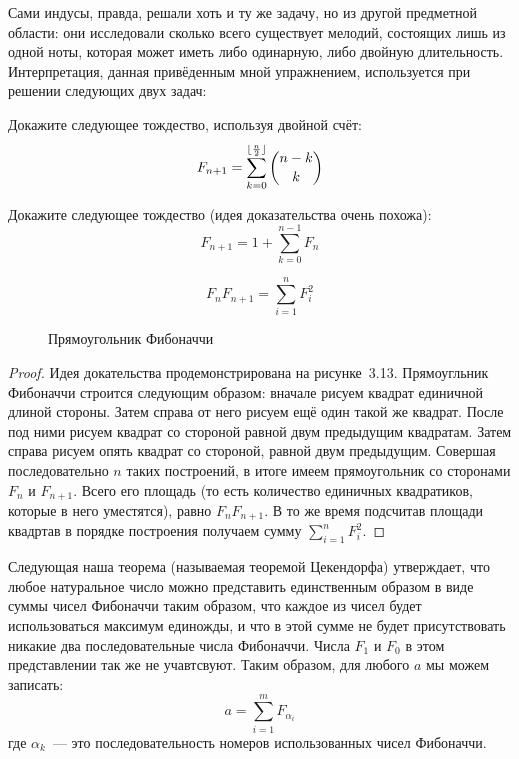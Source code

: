 Сами индусы, правда, решали хоть и ту же задачу, но из другой предметной области: они исследовали сколько всего существует мелодий, состоящих лишь из одной ноты, которая может иметь либо одинарную, либо двойную длительность. Интерпретация, данная привёденным мной упражнением, используется при решении следующих двух задач:

\begin{exercise}
Докажите следующее тождество, используя двойной счёт:
$$F_{n+1} = \sum_{k=0}^{\lfloor {n\over 2}\rfloor} {n-k\choose k}$$
\end{exercise}

\begin{exercise}
Докажите следующее тождество (идея доказательства очень похожа):
$$F_{n+1} = 1+ \sum_{k=0}^{n-1}F_n$$
\end{exercise}

\begin{thm}
$$F_n F_{n+1} = \sum_{i=1}^n F_i^2$$
\end{thm}
\begin{figure}[h]
\centering
{}
\caption{Прямоугольник Фибоначчи}
\end{figure}
\begin{proof}
Идея докательства продемонстрирована на рисунке~3.13. Прямоугльник Фибоначчи строится следующим образом: вначале рисуем квадрат единичной длиной стороны. Затем справа от него рисуем ещё один такой же квадрат. После под ними рисуем квадрат со стороной равной двум предыдущим квадратам. Затем справа рисуем опять квадрат со стороной, равной двум предыдущим. Совершая последовательно $n$ таких построений, в итоге имеем прямоугольник со сторонами $F_n$ и $F_{n+1}$. Всего его площадь (то есть количество единичных квадратиков, которые в него уместятся), равно $F_nF_{n+1}$. В то же время подсчитав площади квадртав в порядке построения получаем сумму  $\sum_{i=1}^n F_i^2$.
\end{proof}

Следующая наша теорема (называемая теоремой Цекендорфа) утверждает, что любое натуральное число можно представить единственным образом в виде суммы чисел Фибоначчи таким образом, что каждое из чисел будет использоваться максимум единожды, и что в этой сумме не будет присутствовать никакие два последовательные числа Фибоначчи. Числа $F_1$ и $F_0$ в этом представлении так же не учавтсвуют. Таким образом, для любого $a$ мы можем записать:
\begin{equation}\label{non:1}
a = \sum_{i=1}^m F_{\alpha_i}
\end{equation}
где $\alpha_k$~--- это последовательность номеров использованных чисел Фибоначчи.

